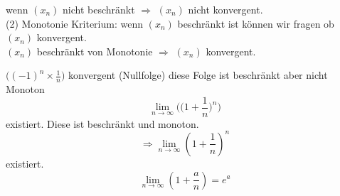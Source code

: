 wenn $(x_n)$ nicht beschränkt $\Rightarrow$ $(x_n)$ nicht konvergent.\\


(2) Monotonie Kriterium:
wenn $(x_n)$ beschränkt ist können wir fragen ob $(x_n)$    konvergent.\\


$(x_n)$ beschränkt von Monotonie $\Rightarrow$ $(x_n)$ konvergent.

\begin{example} %

$\Big((-1)^n \times\frac{1}{n} \Big)$ konvergent (Nullfolge) diese Folge ist beschränkt aber nicht Monoton 
$$ \lim_{n \to \infty}{\Big( \big(1 + \frac{1}{n}\big)^n \Big)} $$  existiert. Diese ist beschränkt und monoton. \\
$$\Rightarrow \lim_{n \to \infty}{(1+\frac{1}{n})^n}$$ 
existiert. 
$$\lim_{n \to \infty}{(1+\frac{a}{n})=e^a}$$
 \end{example}

